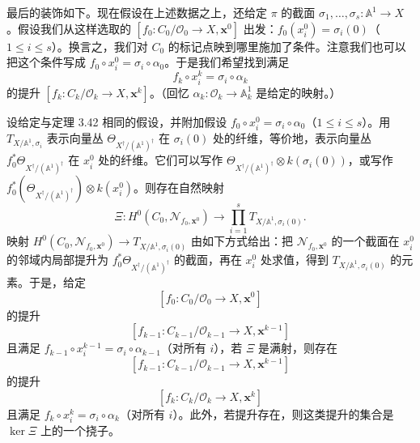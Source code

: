 最后的装饰如下。现在假设在上述数据之上，还给定 $\pi$ 的截面 $\sigma_1,\dots,\sigma_s:\mathbb{A}^1\to X$。假设我们从这样选取的 $[f_0:C_0/\mathcal{O}_0\to X,\mathbf{x}^0]$ 出发：$f_0(x_i^0)=\sigma_i(0)$（$1\le i\le s$）。换言之，我们对 $C_0$ 的标记点映到哪里施加了条件。注意我们也可以把这个条件写成 $f_0\circ x_i^0=\sigma_i\circ\alpha_0$。于是我们希望找到满足
\[
  f_k\circ x_i^k=\sigma_i\circ\alpha_k
\]
的提升 $[f_k:C_k/\mathcal{O}_k\to X,\mathbf{x}^k]$。（回忆 $\alpha_k:\mathcal{O}_k\to\mathbb{A}^1_k$ 是给定的映射。）

\begin{theorem}
设给定与定理 3.42 相同的假设，并附加假设 $f_0\circ x_i^0=\sigma_i\circ\alpha_0$（$1\le i\le s$）。用 $T_{X/\mathbb{A}^1,\sigma_i}$ 表示向量丛 $\Theta_{X^{\dagger}/(\mathbb{A}^1)^{\dagger}}$ 在 $\sigma_i(0)$ 处的纤维，等价地，表示向量丛 $f_0^{*}\Theta_{X^{\dagger}/(\mathbb{A}^1)^{\dagger}}$ 在 $x_i^0$ 处的纤维。它们可以写作 $\Theta_{X^{\dagger}/(\mathbb{A}^1)^{\dagger}}\otimes k(\sigma_i(0))$，或写作 $f_0^{*}(\Theta_{X^{\dagger}/(\mathbb{A}^1)^{\dagger}})\otimes k(x_i^0)$。则存在自然映射
\[
  \Xi:H^0(C_0,\mathcal{N}_{f_0,\mathbf{x}^0})\to\prod_{i=1}^{s}T_{X/\mathbb{A}^1,\sigma_i(0)}.
\]
映射 $H^0(C_0,\mathcal{N}_{f_0,\mathbf{x}^0})\to T_{X/\mathbb{A}^1,\sigma_i(0)}$ 由如下方式给出：把 $\mathcal{N}_{f_0,\mathbf{x}^0}$ 的一个截面在 $x_i^0$ 的邻域内局部提升为 $f_0^{*}\Theta_{X^{\dagger}/(\mathbb{A}^1)^{\dagger}}$ 的截面，再在 $x_i^0$ 处求值，得到 $T_{X/\mathbb{A}^1,\sigma_i(0)}$ 的元素。于是，给定
\[
  [f_0:C_0/\mathcal{O}_0\to X,\mathbf{x}^0]
\]
的提升
\[
  [f_{k-1}:C_{k-1}/\mathcal{O}_{k-1}\to X,\mathbf{x}^{k-1}]
\]
且满足 $f_{k-1}\circ x_i^{k-1}=\sigma_i\circ\alpha_{k-1}$（对所有 $i$），若 $\Xi$ 是满射，则存在
\[
  [f_{k-1}:C_{k-1}/\mathcal{O}_{k-1}\to X,\mathbf{x}^{k-1}]
\]
的提升
\[
  [f_k:C_k/\mathcal{O}_k\to X,\mathbf{x}^k]
\]
且满足 $f_k\circ x_i^k=\sigma_i\circ\alpha_k$（对所有 $i$）。此外，若提升存在，则这类提升的集合是 $\ker\Xi$ 上的一个挠子。
\end{theorem}

